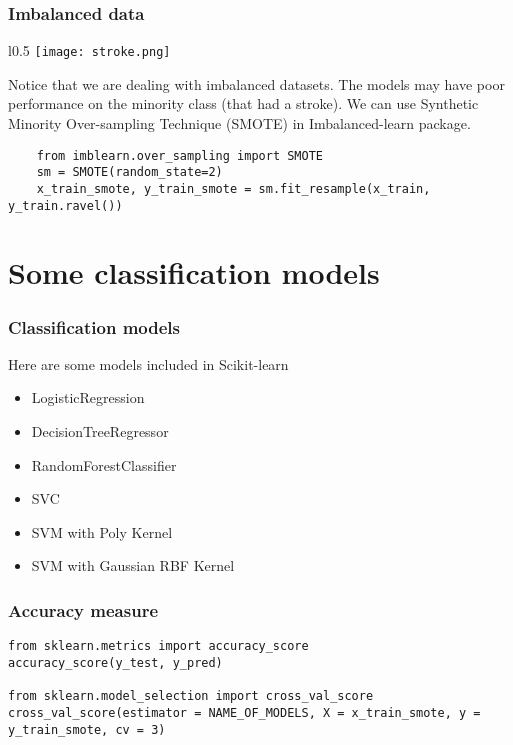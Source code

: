 \documentclass[10pt]{beamer}
\theoremstyle{definition}
\theoremstyle{remark}
\numberwithin{equation}{section}
\begin{document}
\begin{frame}
	\frametitle{Imbalanced data}
	\begin{wrapfigure}{l}{0.5\textwidth}
		\texttt{[image: stroke.png]}
	\end{wrapfigure}
	
Notice that we are dealing with imbalanced datasets. The models may have poor performance on the minority class (that had a stroke). We can use Synthetic Minority Over-sampling Technique (SMOTE) in Imbalanced-learn package.
\end{frame}


\begin{frame}[fragile]

\begin{lstlisting}
	from imblearn.over_sampling import SMOTE
	sm = SMOTE(random_state=2)
	x_train_smote, y_train_smote = sm.fit_resample(x_train, y_train.ravel())
\end{lstlisting}

\end{frame}

\section{Some classification models}
\begin{frame}
\frametitle{Classification models}

Here are some models included in Scikit-learn

\begin{itemize}
	\item LogisticRegression
	
	\item DecisionTreeRegressor
	
	\item RandomForestClassifier
	
	\item SVC
	
	\item SVM with Poly Kernel
	
	\item SVM with Gaussian RBF Kernel
\end{itemize}
\end{frame}

\begin{frame}[fragile]
	\frametitle{Accuracy measure}
	\begin{lstlisting}
from sklearn.metrics import accuracy_score
accuracy_score(y_test, y_pred)

from sklearn.model_selection import cross_val_score
cross_val_score(estimator = NAME_OF_MODELS, X = x_train_smote, y = y_train_smote, cv = 3) 
	\end{lstlisting}
\end{frame}
\end{document}
